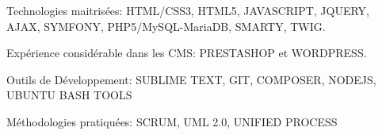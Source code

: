 \begin{cventries}
  \cventry
    {}
    {}
    {}
    {}
    {
      \begin{cvitems}
        \item {Technologies maitrisées: HTML/CSS3, HTML5, JAVASCRIPT, JQUERY, AJAX, SYMFONY, PHP5/MySQL-MariaDB, SMARTY, TWIG.}
        \item {Expérience considérable dans les CMS: PRESTASHOP et WORDPRESS.}
        \item {Outils de Développement: SUBLIME TEXT, GIT, COMPOSER, NODEJS, UBUNTU BASH TOOLS}
        \item {Méthodologie​s pratiquées: SCRUM, UML 2.0, UNIFIED PROCESS}
      \end{cvitems}
    }
\end{cventries}